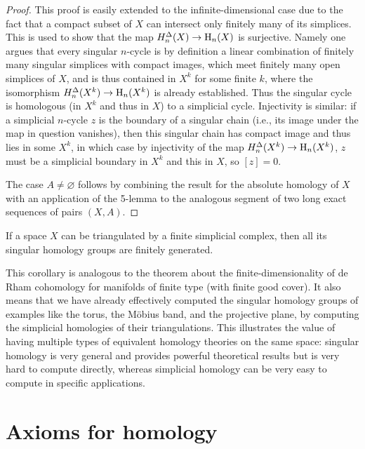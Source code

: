 \begin{proof}
    This proof is easily extended to the infinite-dimensional case due to the fact that a compact subset of $X$ can intersect only finitely many of its simplices. This is used to show that the map $H^\Delta_n(X)\to \mathrm{H}_n(X)$ is surjective. Namely one argues that every singular $n$-cycle is by definition a linear combination of finitely many singular simplices with compact images, which meet finitely many open simplices of $X$, and is thus contained in $X^k$ for some finite $k$, where the isomorphism $H^\Delta_n(X^k)\to \mathrm{H}_n(X^k)$ is already established. Thus the singular cycle is homologous (in $X^k$ and thus in $X$) to a simplicial cycle. Injectivity is similar: if a simplicial $n$-cycle $z$ is the boundary of a singular chain (i.e., its image under the map in question vanishes), then this singular chain has compact image and thus lies in some $X^k$, in which case by injectivity of the map $H^\Delta_n(X^k)\to \mathrm{H}_n(X^k)$, $z$ must be a simplicial boundary in $X^k$ and this in $X$, so $[z]=0$. 
    
    The case $A\neq\varnothing$ follows by combining the result for the absolute homology of $X$ with an application of the 5-lemma to the analogous segment of two long exact sequences of pairs $(X,A)$.
\end{proof}

\begin{cor}
    If a space $X$ can be triangulated by a finite simplicial complex, then all its singular homology groups are finitely generated.
\end{cor}

This corollary is analogous to the theorem about the finite-dimensionality of de Rham cohomology for manifolds of finite type (with finite good cover). It also means that we have already effectively computed the singular homology groups of examples like the torus, the M\"obius band, and the projective plane, by computing the simplicial homologies of their triangulations. This illustrates the value of having multiple types of equivalent homology theories on the same space: singular homology is very general and provides powerful theoretical results but is very hard to compute directly, whereas simplicial homology can be very easy to compute in specific applications.







\section{Axioms for homology}

